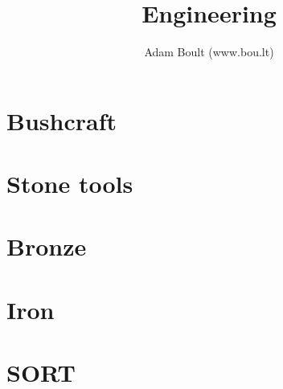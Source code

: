 \documentclass[oneside]{book}
\begin{document}
\author{Adam Boult (www.bou.lt)}
\title{Engineering}
\maketitle

\setcounter{tocdepth}{0}
\tableofcontents



\part{Bushcraft}

\part{Stone tools}

\part{Bronze}

\part{Iron}

\part{SORT}

\end{document}
